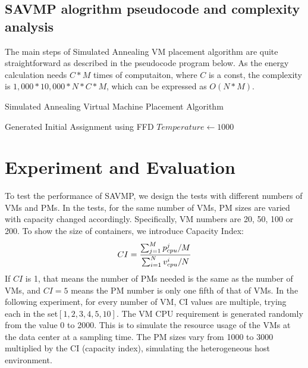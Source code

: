 \documentclass[10pt, conference, compsocconf]{IEEEtran}
\begin{document}
\subsection{SAVMP alogrithm pseudocode and complexity analysis }

The main steps of Simulated Annealing VM placement algorithm are quite
straightforward as described in the pseudocode program below. As the energy
calculation needs $C*M$ times of computaiton, where $C$ is a const, the
complexity is $1,000*10,000*N*C*M$, which can be expressed as $O(N*M)$.

\begin{algorithm}
\SetAlgoLined
\LinesNumbered
\caption{Simulated Annealing Virtual Machine Placement Algorithm}
	Generated Initial Assignment using FFD\; 
	$Temperature\leftarrow 1000$ \;
\end{algorithm}


\section{Experiment and Evaluation}

To test the performance of SAVMP, we design the tests with different numbers of
VMs and PMs. In the tests, for the same number of VMs, PM sizes are varied with
capacity changed accordingly. Specifically, VM numbers are 20, 50, 100 or 200.
To show the size of containers, we introduce Capacity Index:\\
\begin{equation}\label{12}
CI=\frac{\sum_{j=1}^Mp_{cpu}^j / M}{\sum_{i=1}^Nv_{cpu}^i / N} \\
\end{equation} 
If $CI$ is 1, that means the number of PMs needed is the same as the number of
VMs, and $CI=5$ means the PM number is only one fifth of that of VMs. In the
following experiment, for every number of VM, CI values are multiple, trying
each in the set$ [1, 2, 3, 4, 5, 10]$.
The VM CPU requirement is generated randomly from the value 0 to 2000. This is
to simulate the resource usage of the VMs at the data center at a sampling time.
The PM sizes vary from 1000 to 3000 multiplied by the CI (capacity index),
simulating the heterogeneous host environment.
\end{document}
